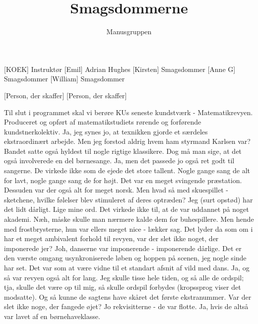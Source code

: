 \documentclass[a4paper,11pt]{article}
\title{Smagsdommerne}
\author{Manusgruppen}
\begin{document}
\maketitle

\begin{roles}
[KOEK] Instruktør
[Emil] Adrian Hughes
[Kirsten] Smagsdommer
[Anne G] Smagsdommer
[William] Smagsdommer
\end{roles}

\begin{props}
[Person, der skaffer]
[Person, der skaffer]
\end{props}


\begin{sketch}
 Til slut i programmet skal vi berøre KUs seneste kundstværk - Matematikrevyen. Produceret og opført af matematikstudiets rørende og forførende kundstnerkolektiv.
 Ja, jeg synes jo, at texnikken gjorde et særdeles ekstraordinært arbejde. Men jeg forstod aldrig hvem ham styrmand Karlsen var?
 Bandet satte også hyldest til nogle rigtige klassikere. Dog må man sige, at det også involverede en del børnesange.
 Ja, men det passede jo også ret godt til sangerne. De virkede ikke som de ejede det store tallent. Nogle gange sang de alt for lavt, nogle gange sang de for højt. Det var en meget svingende præstation. Dessuden var der også alt for meget norsk.
 Men hvad så med skuespillet - sketchene, hvilke følelser blev stimuleret af deres optræden?
 Jeg (surt opstød) har det lidt dårligt.
 Lige mine ord. Det virkede ikke til, at de var uddannet på noget akademi.
 Næh, måske skulle man nærmere kalde dem for buhespillere.
 Men hende med frostbrysterne, hun var ellers meget nice - lækker sag.
 Det lyder da som om i har et meget ambivalent forhold til revyen, var der slet ikke noget, der imponerede jer?
 Joh, danserne var imponerende - imponerende dårlige. Det er den værste omgang usynkroniserede løben og hoppen på scenen, jeg nogle sinde har set. Det var som at være vidne til et standart afsnit af vild med dans.
 Ja, og så var revyen også alt for lang. Jeg skulle tisse hele tiden, og så alle de ordspil; tja, skulle det være op til mig, så skulle ordspil forbydes (kropssprog viser det modsatte). Og så kunne de sagtens have skåret det første ekstranummer.
 Var der slet ikke noge, der fangede øjet?
 Jo rekvisitterne - de var flotte.
 Ja, hvis de altså var lavet af en børnehaveklasse.

\end{sketch}
\end{document}
